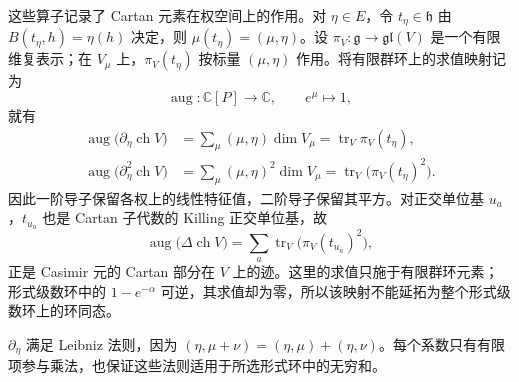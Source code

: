 这些算子记录了 Cartan 元素在权空间上的作用。对 \(\eta\in E\)，令 \(t_\eta\in\mathfrak h\) 由 \(B(t_\eta,h)=\eta(h)\) 决定，则 \(\mu(t_\eta)=(\mu,\eta)\)。设 \(\pi_V:\mathfrak g\to\mathfrak{gl}(V)\) 是一个有限维复表示；在 \(V_\mu\) 上，\(\pi_V(t_\eta)\) 按标量 \((\mu,\eta)\) 作用。将有限群环上的求值映射记为
\[
	\operatorname{aug}:\mathbb C[P]\longrightarrow\mathbb C,\qquad e^\mu\longmapsto1,
\]
就有
\[
	\begin{aligned}
		\operatorname{aug}\bigl(\partial_\eta\operatorname{ch}V\bigr) &=\sum_\mu(\mu,\eta)\dim V_\mu =\operatorname{tr}_V\pi_V(t_\eta),\\
		\operatorname{aug}\bigl(\partial_\eta^2\operatorname{ch}V\bigr) &=\sum_\mu(\mu,\eta)^2\dim V_\mu =\operatorname{tr}_V\bigl(\pi_V(t_\eta)^2\bigr).
	\end{aligned}
\]
因此一阶导子保留各权上的线性特征值，二阶导子保留其平方。对正交单位基 \(u_a\)，\(t_{u_a}\) 也是 Cartan 子代数的 Killing 正交单位基，故
\[
	\operatorname{aug}\bigl(\Delta\operatorname{ch}V\bigr) =\sum_a\operatorname{tr}_V\bigl(\pi_V(t_{u_a})^2\bigr),
\]
正是 Casimir 元的 Cartan 部分在 \(V\) 上的迹。这里的求值只施于有限群环元素；形式级数环中的 \(1-e^{-\alpha}\) 可逆，其求值却为零，所以该映射不能延拓为整个形式级数环上的环同态。

\ProseParagraphBreak
\(\partial_\eta\) 满足 Leibniz 法则，因为 \((\eta,\mu+\nu)=(\eta,\mu)+(\eta,\nu)\)。每个系数只有有限项参与乘法，也保证这些法则适用于所选形式环中的无穷和。

